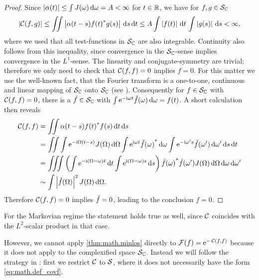 \begin{lem}
  \label{lem:math.covf_sp}
\end{lem}
\begin{proof}
  Since $\left\vert \alpha(t) \right\vert \le \int J(\omega)\, \mathrm{d}\omega = A < \infty$ for $t\in\mathbb{R}$, we have for $f,g\in\mathcal{S}_{\mathbb{C}}$
  \begin{equation*}
    \abs{\varf(f,g)} \le \iint \abs{\alpha(t-s) \cc{f(t)} g(s)} \dd s \dd t
                     \le A \int\abs{f(t)}\dd t \, \int\abs{g(s)}\dd s
                     < \infty,
  \end{equation*}
  where we used that all test-functions in $\mathcal{S}_{\mathbb{C}}$ are also integrable.
  Continuity also follows from this inequality, since convergence in the $\mathcal{S}_{\mathbb{C}}$-sense implies convergence in the $L^1$-sense.
  The linearity and conjugate-symmetry are trivial; therefore we only need to check that $\varf(f,f)=0$ implies $f=0$.
  For this matter we use the well-known fact, that the Fourier transform is a one-to-one, continuous and linear mapping of $\mathcal{S}_{\mathbb{C}}$ onto $\mathcal{S}_{\mathbb{C}}$ (see \cite[Theorem 7.7]{Ru91_functional_analysis}).
  Consequently for $f\in\mathcal{S}_{\mathbb{C}}$ with $\varf(f,f) = 0$, there is a $\check{f}\in\mathcal{S}_{\mathbb{C}}$ with $\int\exp[-\ii\omega t]\ift{f}(\omega)\dd\omega = f(t)$.
  A short calculation then reveals
  \begin{align*}
    \varf(f,f) & = \iint \alpha(t-s) \cc{f(t)} f(s) \dd t \dd s \\
               & = \iint  \int\exp[-\ii \Omega (t-s)]J(\Omega)\dd\Omega  \int\exp[\ii\omega t]\cc{\ift{f}(\omega)}\dd\omega  \int\exp[-\ii\omega' s]\ift{f}(\omega') \dd\omega'  \dd s \dd t \\
               & = \iiint \left(   \int \exp[-\ii(\Omega - \omega)t] \dd t  \int \exp[\ii(\Omega - \omega)s] \dd s  \right) \cc{\ift{f}(\omega)}\ift{f}(\omega') J(\Omega) \dd\Omega \dd\omega \dd\omega' \\
               & \propto \int \abs{\ift{f}(\Omega)}^2 J(\Omega) \dd\Omega.
  \end{align*}
  Therefore $\varf(f,f)=0$ implies $\check{f}=0$, leading to the conclusion $f=0$.
\end{proof}
\begin{rem}
  For the Markovian regime the statement holds true as well, since $\varf$ coincides with the $L^2$-scalar product in that case.\\
\end{rem}

However, we cannot apply \autoref{thm:math.minlos} directly to $\CHF(f)=\exp[-\, \varf(f,f)]$ because it does not apply to the complexified space $\mathcal{S}_{\mathbb{C}}$.
Instead we will follow the strategy in \cite{Hi80_brownian_motion}: first we restrict $\varf$ to $\mathcal{S}$, where it does not necessarily have the form \eqref{eq:math.def_covf}.



